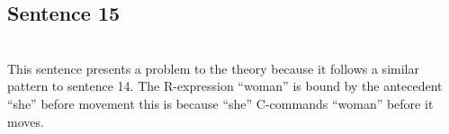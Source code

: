 \documentclass[20pt]{article}
\newcommand{\feature}[1]{\ensuremath{\left[ \text{#1} \right]}}
\newcommand{\treeScale}[0]{0.7}
\begin{document}
\subsection*{Sentence 15}
 \\
This sentence presents a problem to the theory because it follows a similar
pattern to sentence 14. The R-expression ``woman'' is bound by the antecedent
``she'' before movement this is because ``she'' C-commands ``woman'' before it
moves.
\end{document}
